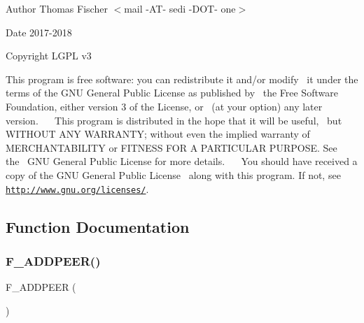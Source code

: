 \begin{DoxyAuthor}{Author}
Thomas Fischer $<$mail -\/\+A\+T-\/ sedi -\/\+D\+O\+T-\/ one$>$ 
\end{DoxyAuthor}
\begin{DoxyDate}{Date}
2017-\/2018 
\end{DoxyDate}
\begin{DoxyCopyright}{Copyright}
L\+G\+PL v3
\end{DoxyCopyright}
This program is free software\+: you can redistribute it and/or modify~\newline
 it under the terms of the G\+NU General Public License as published by~\newline
 the Free Software Foundation, either version 3 of the License, or~\newline
 (at your option) any later version.~\newline
 ~\newline
 This program is distributed in the hope that it will be useful,~\newline
 but W\+I\+T\+H\+O\+UT A\+NY W\+A\+R\+R\+A\+N\+TY; without even the implied warranty of~\newline
 M\+E\+R\+C\+H\+A\+N\+T\+A\+B\+I\+L\+I\+TY or F\+I\+T\+N\+E\+SS F\+OR A P\+A\+R\+T\+I\+C\+U\+L\+AR P\+U\+R\+P\+O\+SE. See the~\newline
 G\+NU General Public License for more details.~\newline
 ~\newline
 You should have received a copy of the G\+NU General Public License~\newline
 along with this program. If not, see \href{http://www.gnu.org/licenses/}{\tt http\+://www.\+gnu.\+org/licenses/}. 

\subsection{Function Documentation}
\mbox{\label{ansible__engine_8sh_ad8cc58f72a5560d0ae9e41b78ac63baf}} 
\subsubsection{\texorpdfstring{F\+\_\+\+A\+D\+D\+P\+E\+E\+R()}{F\_ADDPEER()}}
{\footnotesize\ttfamily F\+\_\+\+A\+D\+D\+P\+E\+ER (\begin{DoxyParamCaption}{ }\end{DoxyParamCaption})}



